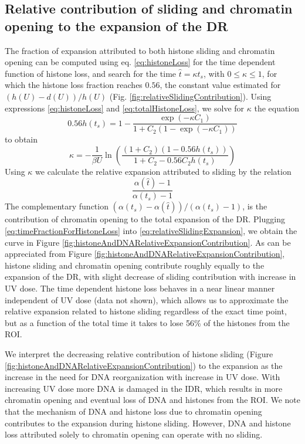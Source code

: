 \documentclass[12pt]{article}
\begin{document}
\subsection{Relative contribution of sliding and chromatin opening to the expansion of the DR}\label{subsection:RelativecontibutionOfSlidingAndOpeningToExpansion}
The fraction of expansion attributed to both histone sliding and chromatin opening can be computed using eq. \ref{eq:histoneLoss} for the time dependent function of histone loss, and search for the time $\hat{t}=\kappa t_s$, with $0\leq \kappa\leq 1$, for which the histone loss fraction reaches $0.56$, the constant value estimated for $(h(U)-d(U))/h(U)$ (Fig. \ref{fig:relativeSlidingContribution}). Using expressions \ref{eq:histoneLoss} and \ref{eq:totalHistoneLoss}, we solve for $\kappa$ the equation
\begin{equation*}
0.56h(t_s)=1-\frac{\exp(-\kappa C_1)}{ 1+C_2(1-\exp(-\kappa C_1))}
\end{equation*}
to obtain
\begin{equation} \label{eq:timeFractionForHistoneLoss}
\kappa = -\frac{1}{\beta U}\ln{\left( \frac{(1+C_2)(1-0.56h(t_s))}{1+C_2 -0.56C_2h(t_s)}\right)}
\end{equation}
Using $\kappa$ we calculate the relative expansion attributed to sliding by the relation
\begin{equation} \label{eq:relativeSlidingExpansion}
\frac{\alpha(\hat{t})-1}{\alpha (t_s)-1}
\end{equation}
The complementary function $\left(\alpha(t_s)-\alpha(\hat{t})\right) /\left(\alpha(t_s)-1\right)$, is the contribution of chromatin opening to the total expansion of the DR. Plugging \ref{eq:timeFractionForHistoneLoss} into \ref{eq:relativeSlidingExpansion}, we obtain the curve in Figure \ref{fig:histoneAndDNARelativeExpansionContribution}. As can be appreciated from Figure \ref{fig:histoneAndDNARelativeExpansionContribution}, histone sliding and chromatin opening contribute roughly equally to the expansion of the DR, with slight decrease of sliding contribution with increase in UV dose.
The time dependent histone loss behaves in a near linear manner independent of UV dose (data not shown), which allows us to approximate the relative expansion related to histone sliding regardless of the exact time point, but as a function of the total time it takes to lose 56\% of the histones from the ROI. 

We interpret the decreasing relative contribution of histone sliding (Figure \ref{fig:histoneAndDNARelativeExpansionContribution}) to the expansion as the increase in the need for DNA reorganization with increase in UV dose. With increasing UV dose more DNA is damaged in the IDR, which results in more chromatin opening and eventual loss of DNA and histones from the ROI. We note that the mechanism of DNA and histone loss due to chromatin opening contributes to the expansion during histone sliding. However, DNA and histone loss attributed solely to chromatin opening can operate with no sliding. 
\end{document}
